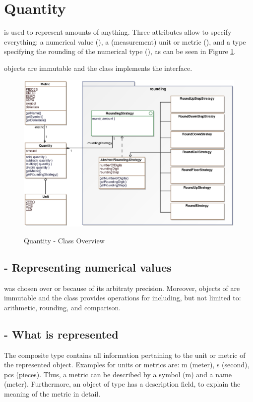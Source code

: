 \newpage
\section{Quantity}
 is used to represent amounts of anything.
Three attributes allow  to specify everything: a numerical value (), a (measurement) unit or metric (), and a type specifying the rounding of the numerical type (), as can be seen in Figure \ref{quantity_overview}.

 objects are immutable and the class implements the  interface.

\begin{figure}[ht]
	\centering
  \includegraphics[width=1.0\textwidth]{images/Quantity_Overview.eps}
	\label{quantity_overview}
	\caption{Quantity - Class Overview}
\end{figure}

\subsection{ - Representing numerical values}
 was chosen over  or  because of its arbitraty precision.
Moreover, objects of  are immutable and the  class provides operations for including, but not limited to: arithmetic, rounding, and comparison.

\subsection{ - What is represented}
The composite type  contains all information pertaining to the unit or metric of the represented object.
Examples for units or metrics are: m (meter), s (second), pcs (pieces).
Thus, a metric can be described by a symbol (m) and a name (meter).
Furthermore, an object of type  has a description field, to explain the meaning of the metric in detail.

